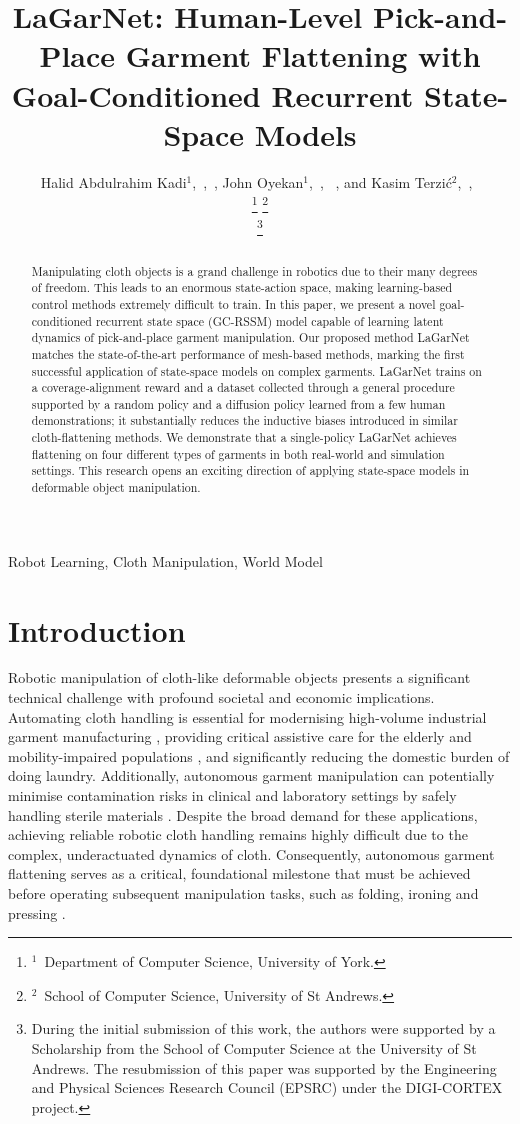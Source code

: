 \documentclass[journal]{IEEEtran}
\title{LaGarNet: Human-Level Pick-and-Place Garment Flattening with Goal-Conditioned Recurrent State-Space Models}
\author{
Halid Abdulrahim Kadi$^{1}$,~\IEEEmembership{Member,~IEEE},~\orcidlink{0000-0001-9290-467X},
John Oyekan$^{1}$,~\IEEEmembership{Member,~IEEE},~\orcidlink{0000-0001-6578-9928}
, and
Kasim Terzi{\'c}$^{2}$,~\IEEEmembership{Member,~IEEE},~\orcidlink{0000-0001-6692-209X}

\thanks{$^{1}$~Department of Computer Science, University of York.}
\thanks{$^{2}$~School of Computer Science, University of St Andrews.}

\thanks{During the initial submission of this work, the authors were supported by a Scholarship from the School of Computer Science at the University of St Andrews. The resubmission of this paper was supported by the Engineering and Physical Sciences Research Council (EPSRC) under the DIGI-CORTEX project.}
}
\begin{document}
\maketitle

\begin{abstract} Manipulating cloth objects is a grand challenge in robotics due to their many degrees of freedom. This leads to an enormous state-action space, making learning-based control methods extremely difficult to train. In this paper, we present a novel goal-conditioned recurrent state space (GC-RSSM) model capable of learning latent dynamics of pick-and-place garment manipulation. Our proposed method LaGarNet matches the state-of-the-art performance of mesh-based methods, marking the first successful application of state-space models on complex garments. LaGarNet trains on a coverage-alignment reward and a dataset collected through a general procedure supported by a random policy and a diffusion policy learned from a few human demonstrations; it substantially reduces the inductive biases introduced in similar cloth-flattening methods. We demonstrate that a single-policy LaGarNet achieves flattening on four different types of garments in both real-world and simulation settings. This research opens an exciting direction of applying state-space models in deformable object manipulation.
\end{abstract}

\begin{IEEEkeywords}
Robot Learning, Cloth Manipulation, World Model
\end{IEEEkeywords}


\section{Introduction} \label{sec:introduction}

Robotic manipulation of cloth-like deformable objects presents a significant technical challenge with profound societal and economic implications. Automating cloth handling is essential for modernising high-volume industrial garment manufacturing \cite{nayak2018introduction}, providing critical assistive care for the elderly and mobility-impaired populations \cite{WHOaged2024, disablity2011world}, and significantly reducing the domestic burden of doing laundry. Additionally, autonomous garment manipulation can potentially minimise contamination risks in clinical and laboratory settings by safely handling sterile materials \cite{cornish2021clinical}. Despite the broad demand for these applications, achieving reliable robotic cloth handling remains highly difficult due to the complex, underactuated dynamics of cloth. Consequently, autonomous garment flattening serves as a critical, foundational milestone that must be achieved before operating subsequent manipulation tasks, such as folding, ironing and pressing \cite{doumanoglou2016folding}.
\end{document}
